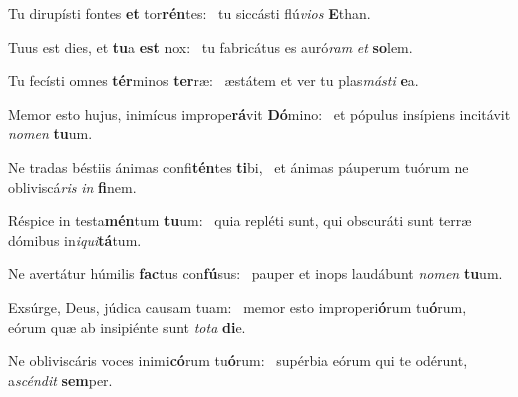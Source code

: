 \item Tu dirupísti fontes \textbf{et} tor\textbf{rén}tes:~\psstar{} tu siccásti flú\textit{vios} \textbf{E}than.
\item Tuus est dies, et \textbf{tu}a \textbf{est} nox:~\psstar{} tu fabricátus es auró\textit{ram} \textit{et} \textbf{so}lem.
\item Tu fecísti omnes \textbf{tér}minos \textbf{ter}ræ:~\psstar{} æstátem et ver tu plas\textit{másti} \textbf{e}a.
\item Memor esto hujus, inimícus imprope\textbf{rá}vit \textbf{Dó}mino:~\psstar{} et pópulus insípiens incitávit \textit{nomen} \textbf{tu}um.
\item Ne tradas béstiis ánimas confi\textbf{tén}tes \textbf{ti}bi,~\psstar{} et ánimas páuperum tuórum ne obliviscá\textit{ris} \textit{in} \textbf{fi}nem.
\item Réspice in testa\textbf{mén}tum \textbf{tu}um:~\psstar{} quia repléti sunt, qui obscuráti sunt terræ dómibus in\textit{iqui}\textbf{tá}tum.
\item Ne avertátur húmilis \textbf{fac}tus con\textbf{fú}sus:~\psstar{} pauper et inops laudábunt \textit{nomen} \textbf{tu}um.
\item Exsúrge, Deus, júdica causam tuam:~\pscross{} memor esto improperi\textbf{ó}rum tu\textbf{ó}rum,~\psstar{} eórum quæ ab insipiénte sunt \textit{tota} \textbf{di}e.
\item Ne obliviscáris voces inimi\textbf{có}rum tu\textbf{ó}rum:~\psstar{} supérbia eórum qui te odérunt, a\textit{scéndit} \textbf{sem}per.
